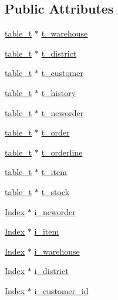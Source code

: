 \subsection*{Public Attributes}
\begin{DoxyCompactItemize}
\item 
\hyperlink{classtable__t}{table\+\_\+t} $\ast$ \hyperlink{classtpcc__wl_a7f1b94e2593ed24fca5a17f333b791d2}{t\+\_\+warehouse}
\item 
\hyperlink{classtable__t}{table\+\_\+t} $\ast$ \hyperlink{classtpcc__wl_ab6ffc1626573b440aded5f486d98efe0}{t\+\_\+district}
\item 
\hyperlink{classtable__t}{table\+\_\+t} $\ast$ \hyperlink{classtpcc__wl_af681ca32f116c918125ff8dba2b691c2}{t\+\_\+customer}
\item 
\hyperlink{classtable__t}{table\+\_\+t} $\ast$ \hyperlink{classtpcc__wl_a6aa6043e365676fda7c73dbd4375ae8e}{t\+\_\+history}
\item 
\hyperlink{classtable__t}{table\+\_\+t} $\ast$ \hyperlink{classtpcc__wl_a7d19533ceca41d61f53be7583754728d}{t\+\_\+neworder}
\item 
\hyperlink{classtable__t}{table\+\_\+t} $\ast$ \hyperlink{classtpcc__wl_a7fc94bd27a10a35596de54535f5890b5}{t\+\_\+order}
\item 
\hyperlink{classtable__t}{table\+\_\+t} $\ast$ \hyperlink{classtpcc__wl_a6997edcda46944d16c8e737c219ec1f5}{t\+\_\+orderline}
\item 
\hyperlink{classtable__t}{table\+\_\+t} $\ast$ \hyperlink{classtpcc__wl_a3d3103f3a058fd807f694f89a66cdeaa}{t\+\_\+item}
\item 
\hyperlink{classtable__t}{table\+\_\+t} $\ast$ \hyperlink{classtpcc__wl_ac91d9c6ee29b3ae4b83f158feb3578de}{t\+\_\+stock}
\item 
\hyperlink{classIndex}{Index} $\ast$ \hyperlink{classtpcc__wl_acf94d40002b08d6924220c33ac68fcc3}{i\+\_\+neworder}
\item 
\hyperlink{classIndex}{Index} $\ast$ \hyperlink{classtpcc__wl_a86a912b9ef6717eaea8e41a38061c8af}{i\+\_\+item}
\item 
\hyperlink{classIndex}{Index} $\ast$ \hyperlink{classtpcc__wl_a45c383109926ea008ca82c452ca22ad4}{i\+\_\+warehouse}
\item 
\hyperlink{classIndex}{Index} $\ast$ \hyperlink{classtpcc__wl_a87bf44cbe0c6bee28ca7d1d414a7a99f}{i\+\_\+district}
\item 
\hyperlink{classIndex}{Index} $\ast$ \hyperlink{classtpcc__wl_a2ce0867b3a24e9f57e06a2733c7829ab}{i\+\_\+customer\+\_\+id}
\item 

\end{DoxyCompactItemize}
